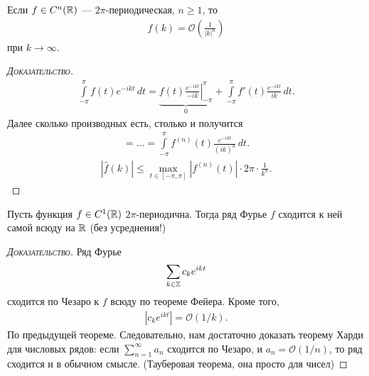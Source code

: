 \documentclass[../complex-analysis.tex]{subfiles}
\begin{document}
\begin{thm}
 Если $ f \in C^{n}(\mathbb{R}) $ --- $ 2\pi $-периодическая, $ n \geqslant 1 $, то 
 \begin{align*}
  \hat f(k) = \mathcal O\left( \frac{1}{\left| k \right|^{n}}\right)
 \end{align*} при $ k \to \infty $.
\end{thm}
\begin{proof}[\normalfont\textsc{Доказательство}]
 \begin{align*}
  \int\limits_{-\pi}^{\pi} f(t)e^{-ikt}\,dt = \underbrace{f(t) \left.\frac{e^{-ikt}}{-ik}\right|_{-\pi}^{\pi}}_{0} + \int\limits_{-\pi}^{\pi} f'(t) \frac{e^{-ikt}}{ik}\,dt.
 \end{align*} Далее сколько производных есть, столько и получится
 \begin{align*}
  = \ldots = \int\limits_{-\pi}^{\pi} f^{(n)}(t) \frac{ e^{-ikt}}{(ik)^{n}}\,dt.
 \end{align*}
 \begin{align*}
  \left| \hat f(k) \right| \leqslant \max_{t \in [-\pi,\pi]} \left| f^{(n)}(t) \right| \cdot 2\pi \cdot \frac{1}{k^{n}}.
 \end{align*}
\end{proof}

\begin{thm}[Харди]
 Пусть функция $ f \in C^{1}(\mathbb{R}) $ $ 2\pi $-периодична. Тогда ряд Фурье $ f $ сходится к ней самой всюду на $ \mathbb{R} $ (без усреднения!)
\end{thm}
\begin{proof}[\normalfont\textsc{Доказательство}]
 Ряд Фурье
 \begin{align*}
  \sum_{k \in \mathbb{Z}}c_k e^{ikt}
 \end{align*} сходится по Чезаро к $ f $ всюду по теореме Фейера. Кроме того,
 \begin{align*}
  \left| c_ke^{ikt} \right| = \mathcal O(1 / k).
 \end{align*} По предыдущей теореме. Следовательно, нам достаточно доказать теорему Харди для числовых рядов: если $ \sum_{n=1}^{\infty} a_n $ сходится по Чезаро, и $ a_n = \mathcal O(1 / n) $, то ряд сходится и в обычном смысле. (Тауберовая теорема, она просто для чисел)
\end{proof}
\end{document}

